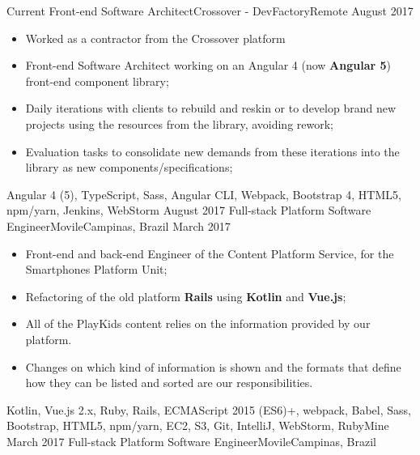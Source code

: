 %
%
%

\begin{experiences}
  \experience
    {Current}   {Front-end Software Architect}{Crossover - DevFactory}{Remote}
    {August 2017} {
    \begin{itemize}
      \item Worked as a contractor from the Crossover platform
      \item Front-end Software Architect working on an Angular 4 (now \textbf{Angular 5}) front-end component library;
      \item Daily iterations with clients to rebuild and reskin or to develop brand new projects using the resources from the library, avoiding rework;
      \item Evaluation tasks to consolidate new demands from these iterations into the library as new components/specifications;
    \end{itemize}
  }
  {Angular 4 (5), TypeScript, Sass, Angular CLI, Webpack, Bootstrap 4, HTML5, npm/yarn, Jenkins, WebStorm}
  \emptySeparator
  \experience
    {August 2017}   {Full-stack Platform Software Engineer}{Movile}{Campinas, Brazil}
    {March 2017} {
    \begin{itemize}
      \item Front-end and back-end Engineer of the Content Platform Service, for the Smartphones Platform Unit;
      \item Refactoring of the old platform \textbf{Rails} using \textbf{Kotlin} and \textbf{Vue.js};
      \item All of the PlayKids content relies on the information provided by our platform.\\
      \item Changes on which kind of information is shown and the formats that define how they can be listed and sorted are our responsibilities.
    \end{itemize}
  }
  {Kotlin, Vue.js 2.x, Ruby, Rails, ECMAScript 2015 (ES6)+, webpack, Babel, Sass, Bootstrap, HTML5, npm/yarn, EC2, S3, Git, IntelliJ, WebStorm, RubyMine}
  \emptySeparator
  \experience
    {March 2017}   {Full-stack Platform Software Engineer}{Movile}{Campinas, Brazil}

\end{experiences}
